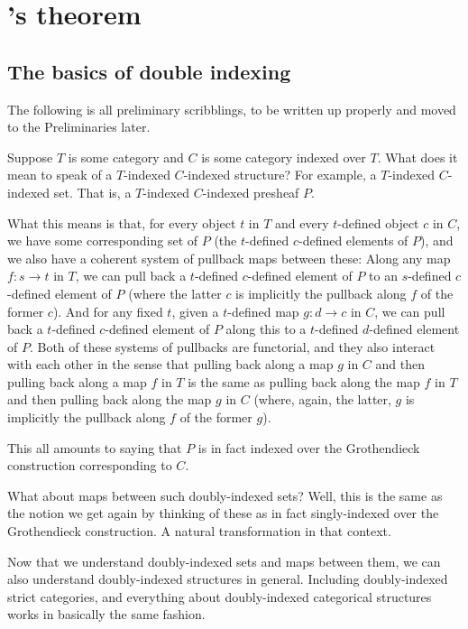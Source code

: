 \section{\Loeb's theorem}

\subsection{The basics of double indexing}
\begin{TODOblock}
The following is all preliminary scribblings, to be written up properly and moved to the Preliminaries later.
\end{TODOblock}

Suppose $T$ is some category and $C$ is some category indexed over $T$. What does it mean to speak of a $T$-indexed $C$-indexed structure? For example, a $T$-indexed $C$-indexed set. That is, a $T$-indexed $C$-indexed presheaf $P$.

What this means is that, for every object $t$ in $T$ and every $t$-defined object $c$ in $C$, we have some corresponding set of $P$ (the $t$-defined $c$-defined elements of $P$), and we also have a coherent system of pullback maps between these: Along any map $f : s \to t$ in $T$, we can pull back a $t$-defined $c$-defined element of $P$ to an $s$-defined $c$-defined element of $P$ (where the latter $c$ is implicitly the pullback along $f$ of the former $c$). And for any fixed $t$, given a $t$-defined map $g : d \to c$ in $C$, we can pull back a $t$-defined $c$-defined element of $P$ along this to a $t$-defined $d$-defined element of $P$. Both of these systems of pullbacks are functorial, and they also interact with each other  in the sense that pulling back along a map $g$ in $C$ and then pulling back along a map $f$ in $T$ is the same as pulling back along the map $f$ in $T$ and then pulling back along the map $g$ in $C$ (where, again, the latter, $g$ is implicitly the pullback along $f$ of the former $g$).

This all amounts to saying that $P$ is in fact indexed over the Grothendieck construction corresponding to $C$.

What about maps between such doubly-indexed sets? Well, this is the same as the notion we get again by thinking of these as in fact singly-indexed over the Grothendieck construction. A natural transformation in that context.

Now that we understand doubly-indexed sets and maps between them, we can also understand doubly-indexed structures in general. Including doubly-indexed strict categories, and everything about doubly-indexed categorical structures works in basically the same fashion.

